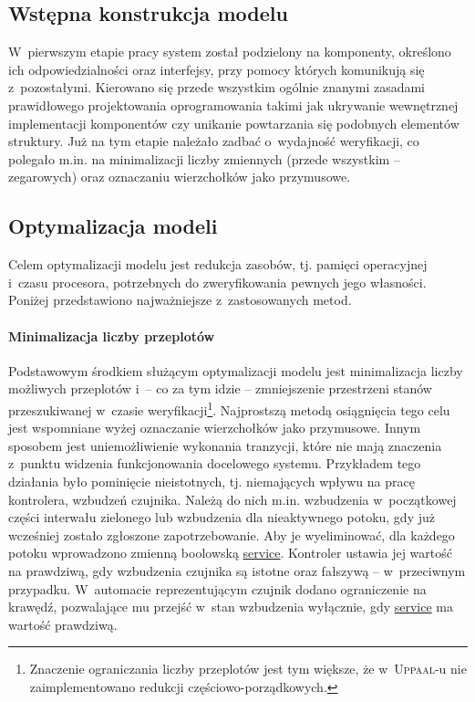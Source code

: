 \documentclass{pracamgr}
\newcommand{\upp}{\textsc{Uppaal}}
\theoremstyle{plain}
\begin{document}
\subsection{Wstępna konstrukcja modelu}

W~pierwszym etapie pracy system został podzielony na komponenty,
określono ich odpowiedzialności oraz interfejsy, przy pomocy których
komunikują się z~pozostałymi. Kierowano się przede wszystkim ogólnie
znanymi zasadami prawidłowego projektowania oprogramowania takimi jak
ukrywanie wewnętrznej implementacji komponentów czy unikanie
powtarzania się podobnych elementów struktury. Już na tym etapie
należało zadbać o~wydajność weryfikacji, co polegało m.in. na
minimalizacji liczby zmiennych (przede wszystkim -- zegarowych) oraz
oznaczaniu wierzchołków jako przymusowe.

\subsection{Optymalizacja modeli}
\label{s:models:opt}

Celem optymalizacji modelu jest redukcja zasobów, tj. pamięci
operacyjnej i~czasu procesora, potrzebnych do zweryfikowania pewnych
jego własności. Poniżej przedstawiono najważniejsze z~zastosowanych metod.

\paragraph{Minimalizacja liczby przeplotów} Podstawowym środkiem
służącym optymalizacji modelu jest minimalizacja liczby możliwych
przeplotów i~-- co za tym idzie -- zmniejszenie przestrzeni stanów
przeszukiwanej w~czasie weryfikacji\footnote{Znaczenie ograniczania
  liczby przeplotów jest tym większe, że w~\upp-u nie zaimplementowano
  redukcji częściowo-porządkowych.}. Najprostszą metodą osiągnięcia
tego celu jest wspomniane wyżej oznaczanie wierzchołków jako przymusowe.
Innym sposobem jest uniemożliwienie wykonania tranzycji, które nie
mają znaczenia z~punktu widzenia funkcjonowania docelowego
systemu. Przykładem tego działania było pominięcie nieistotnych,
tj. niemających wpływu na pracę kontrolera, wzbudzeń czujnika. Należą
do nich m.in. wzbudzenia w~początkowej części interwału zielonego lub
wzbudzenia dla nieaktywnego potoku, gdy już wcześniej zostało
zgłoszone zapotrzebowanie. Aby je wyeliminować, dla każdego potoku
wprowadzono zmienną boolowską \url{service}. Kontroler ustawia
jej wartość na prawdziwą, gdy wzbudzenia czujnika są istotne oraz
fałszywą -- w~przeciwnym przypadku. W~automacie reprezentującym
czujnik dodano ograniczenie na krawędź, pozwalające mu przejść w~stan
wzbudzenia wyłącznie, gdy \url{service} ma wartość prawdziwą.
\end{document}
